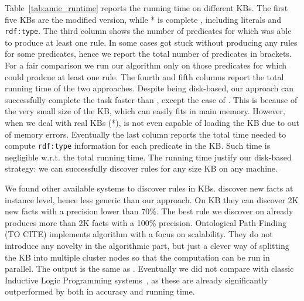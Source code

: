 Table~\ref{tab:amie_runtime} reports the running time on different KBs. The first five KBs are the \amie modified version, while * is complete \yago, including literals and \texttt{rdf:type}. The third column shows the number of predicates for which \amie was able to produce at least one rule. In some cases \amie got stuck without producing any rules for some predicates, hence we report the total number of predicates in brackets. For a fair comparison we run our algorithm only on those predicates for which \amie could prodcue at least one rule. The fourth and fifth columns report the total running time of the two approaches. Despite being disk-based, our approach can successfully complete the task faster than \amie, except the case of . This is because of the very small size of the KB, which can easily fits in main memory. However, when we deal with real KBs (*), \amie is not even capable of loading the KB due to out of memory errors. Eventually the last column reports the total time needed to compute \texttt{rdf:type} information for each predicate in the KB. Such time is negligible w.r.t. the total running time. The running time justify our disk-based strategy: we can successfully discover rules for any size KB on any machine.

We found other available systems to discover rules in KBs. \cite{abedjan2014amending} discover new facts at instance level, hence less generic than our approach. On \amie {} KB they can discover 2K new facts with a precision lower than 70\%. The best rule we discover on  already produces more than 2K facts with a 100\% precision. Ontological Path Finding (TO CITE) implements \amie algorithm with a focus on scalability. They do not introduce any novelty in the algorithmic part, but just a clever way of splitting the KB into multiple cluster nodes so that the computation can be run in parallel. The output is the same as \amie. Eventually we did not compare with classic Inductive Logic Programming systems~\cite{dehaspe1999discovery,muggleton1995inverse}, as these are already significantly outperformed by \amie both in accuracy and running time.

